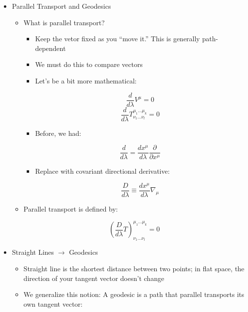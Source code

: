 \begin{itemize}
  \item Parallel Transport and Geodesics

    \begin{itemize}

      \item What is parallel transport?

        \begin{itemize}

          \item Keep the vetor fixed as you ``move it.'' This is generally path-dependent

          \item We must do this to compare vectors

          \item Let's be a bit more mathematical:

            $$\frac{d}{d\lambda}V^{\mu}=0$$
            $$\frac{d}{d\lambda}T^{\mu_1\ldots\mu_k}_{\nu_1\ldots\nu_l}=0$$

          \item Before, we had:

            $$\frac{d}{d\lambda}=\frac{dx^{\mu}}{d\lambda}\frac{\partial}{\partial x^{\mu}}$$

          \item Replace with covariant directional derivative:

            $$\frac{D}{d\lambda}\equiv\frac{dx^{\mu}}{d\lambda}\nabla_{\mu}$$

        \end{itemize}

      \item Parallel transport is defined by:

        $$\left( \frac{D}{d\lambda} T \right)^{\mu_1\ldots\mu_k}_{\nu_1\ldots\nu_l}=0$$

    \end{itemize}

  \item Straight Lines $\to$ Geodesics

    \begin{itemize}

      \item Straight line is the shortest distance between two points; in flat space, the direction of your tangent vector doesn't change

      \item We generalize this notion: A geodesic is a path that parallel transports its own tangent vector:


\end{itemize}
\end{itemize}
